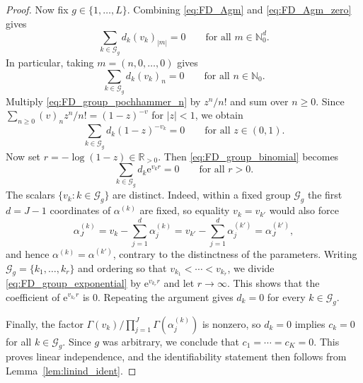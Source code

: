 \documentclass[10pt,a4paper]{amsart}
\begin{document}
\begin{proof}
Now fix $g\in\{1,\dots,L\}$. Combining \eqref{eq:FD_Agm} and \eqref{eq:FD_Agm_zero}
gives 
\begin{equation}
\sum_{k\in\mathcal{G}_{g}}d_{k}(v_{k})_{|m|}=0\qquad\text{for all }m\in\mathbb{N}_{0}^{d}.\label{eq:FD_group_pochhammer}
\end{equation}
In particular, taking $m=(n,0,\dots,0)$ gives 
\begin{equation}
\sum_{k\in\mathcal{G}_{g}}d_{k}(v_{k})_{n}=0\qquad\text{for all }n\in\mathbb{N}_{0}.\label{eq:FD_group_pochhammer_n}
\end{equation}
Multiply \eqref{eq:FD_group_pochhammer_n} by $z^{n}/n!$ and sum
over $n\ge0$. Since $\sum_{n\ge0}(v)_{n}z^{n}/n!=(1-z)^{-v}$ for
$|z|<1$, we obtain 
\begin{equation}
\sum_{k\in\mathcal{G}_{g}}d_{k}(1-z)^{-v_{k}}=0\qquad\text{for all }z\in(0,1).\label{eq:FD_group_binomial}
\end{equation}
Now set $r=-\log(1-z)\in\mathbb{R}_{>0}$. Then \eqref{eq:FD_group_binomial}
becomes 
\begin{equation}
\sum_{k\in\mathcal{G}_{g}}d_{k}\mathrm{e}^{v_{k}r}=0\qquad\text{for all }r>0.\label{eq:FD_group_exponential}
\end{equation}
The scalars $\{v_{k}:k\in\mathcal{G}_{g}\}$ are distinct. Indeed,
within a fixed group $\mathcal{G}_{g}$ the first $d=J-1$ coordinates
of $\alpha^{(k)}$ are fixed, so equality $v_{k}=v_{k'}$ would also
force 
\[
\alpha_{J}^{(k)}=v_{k}-\sum_{j=1}^{d}\alpha_{j}^{(k)}=v_{k'}-\sum_{j=1}^{d}\alpha_{j}^{(k')}=\alpha_{J}^{(k')},
\]
and hence $\alpha^{(k)}=\alpha^{(k')}$, contrary to the distinctness
of the parameters. Writing $\mathcal{G}_{g}=\{k_{1},\dots,k_{r}\}$
and ordering so that $v_{k_{1}}<\cdots<v_{k_{r}}$, we divide \eqref{eq:FD_group_exponential}
by $\mathrm{e}^{v_{k_{r}}r}$ and let $r\to\infty$. This shows that
the coefficient of $\mathrm{e}^{v_{k_{r}}r}$ is $0$. Repeating the
argument gives $d_{k}=0$ for every $k\in\mathcal{G}_{g}$.

Finally, the factor $\Gamma(v_{k})/\prod_{j=1}^{J}\Gamma(\alpha_{j}^{(k)})$
is nonzero, so $d_{k}=0$ implies $c_{k}=0$ for all $k\in\mathcal{G}_{g}$.
Since $g$ was arbitrary, we conclude that $c_{1}=\cdots=c_{K}=0$.
This proves linear independence, and the identifiability statement
then follows from Lemma~\ref{lem:linind_ident}. 
\end{proof}
\end{document}
